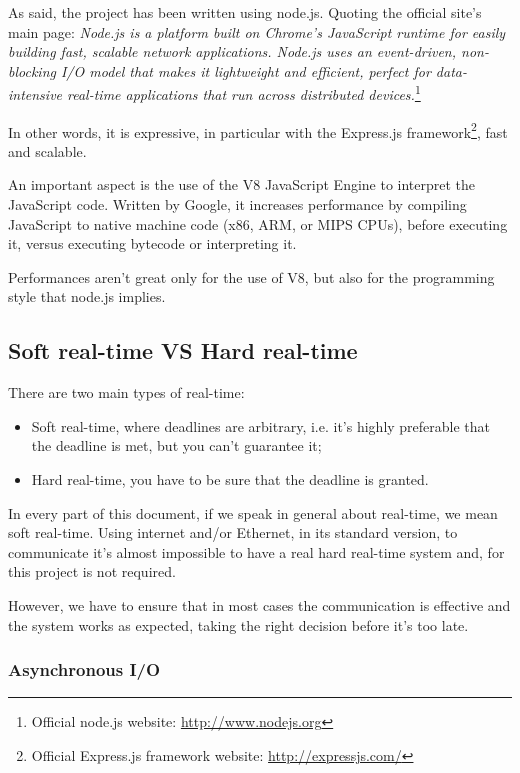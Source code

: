 As said, the project has been written using node.js. Quoting the official site's main page: \textit{Node.js is a platform built on Chrome's JavaScript runtime for easily building fast, scalable network applications. Node.js uses an event-driven, non-blocking I/O model that makes it lightweight and efficient, perfect for data-intensive real-time applications that run across distributed devices.}\footnote{Official node.js website: \url{http://www.nodejs.org}}

In other words, it is expressive, in particular with the Express.js framework\footnote{Official Express.js framework website: \url{http://expressjs.com/}}, fast and scalable.

An important aspect is the use of the V8 JavaScript Engine to interpret the JavaScript code. Written by Google, it increases performance by compiling JavaScript to native machine code (x86, ARM, or MIPS CPUs)\cite{website:v8-intro}, before executing it, versus executing bytecode or interpreting it.

Performances aren't great only for the use of V8, but also for the programming style that node.js implies.

\subsection{Soft real-time VS Hard real-time}
There are two main types of real-time:
\begin{itemize}
	\item Soft real-time, where deadlines are arbitrary, i.e. it's highly preferable that the deadline is met, but you can't guarantee it;
	\item Hard real-time, you have to be sure that the deadline is granted.
\end{itemize}

In every part of this document, if we speak in general about real-time, we mean soft real-time. Using internet and/or Ethernet, in its standard version, to communicate it's almost impossible to have a real hard real-time system and, for this project is not required. 

However, we have to ensure that in most cases the communication is effective and the system works as expected, taking the right decision before it's too late.

\subsubsection{Asynchronous I/O}
\label{sec:async}

